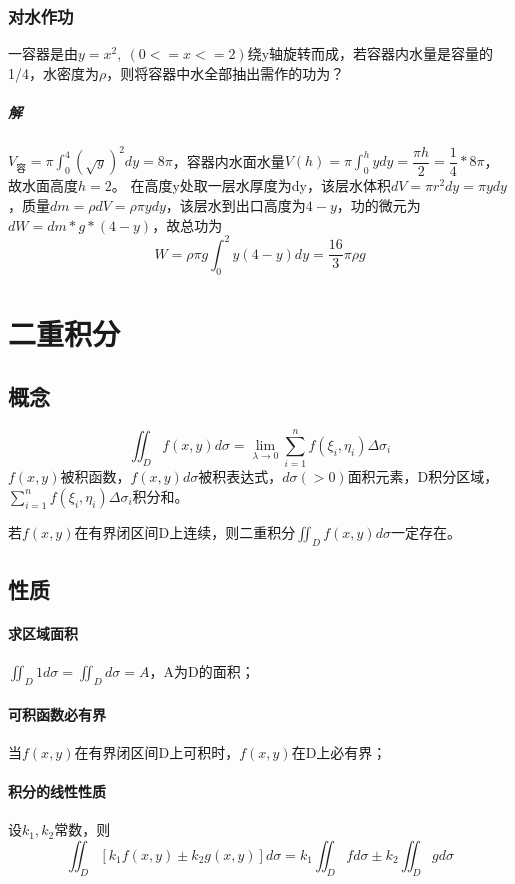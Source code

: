 \subsubsection{对水作功}
一容器是由\(y = x^2,\ (0 <= x <= 2)\)绕y轴旋转而成，若容器内水量是容量的1/4，水密度为\(\rho\)，则将容器中水全部抽出需作的功为？
\subparagraph{解}
\(V_{\text{容}} = \pi\displaystyle\int_0^4(\sqrt{y})^2dy = 8\pi\)，容器内水面水量\(V(h) = \pi\displaystyle\int_0^hydy = \dfrac{\pi h}{2} = \dfrac{1}{4} * 8\pi\)，故水面高度\(h = 2\)。
在高度y处取一层水厚度为dy，该层水体积\(dV = \pi r^2dy = \pi ydy\)，质量\(dm = \rho dV = \rho\pi ydy\)，该层水到出口高度为\(4 - y\)，功的微元为\(dW = dm * g * (4 - y)\)，故总功为\[W = \rho\pi g\int_0^2y(4 - y)dy = \dfrac{16}{3}\pi\rho g\]




\section{二重积分}

\subsection{概念}
\[\iint_Df(x, y)d\sigma = \lim_{\lambda \to 0}\sum_{i = 1}^nf(\xi_i, \eta_i)\Delta\sigma_i\]
\(f(x, y)\)被积函数，\(f(x, y)d\sigma\)被积表达式，\(d\sigma( > 0)\)面积元素，D积分区域，\(\displaystyle\sum_{i = 1}^nf(\xi_i, \eta_i)\Delta\sigma_i\)积分和。

若\(f(x, y)\)在有界闭区间D上连续，则二重积分\(\displaystyle\iint_Df(x, y)d\sigma\)一定存在。


\subsection{性质}

\paragraph{求区域面积}
\(\displaystyle\iint_D1d\sigma = \iint_Dd\sigma = A\)，A为D的面积；

\paragraph{可积函数必有界}
当\(f(x, y)\)在有界闭区间D上可积时，\(f(x, y)\)在D上必有界；

\paragraph{积分的线性性质}
设\(k_1, k_2\)常数，则\[\iint_D[k_1f(x, y) \pm k_2g(x, y)]d\sigma = k_1\iint_Dfd\sigma \pm k_2\iint_Dgd\sigma\]

